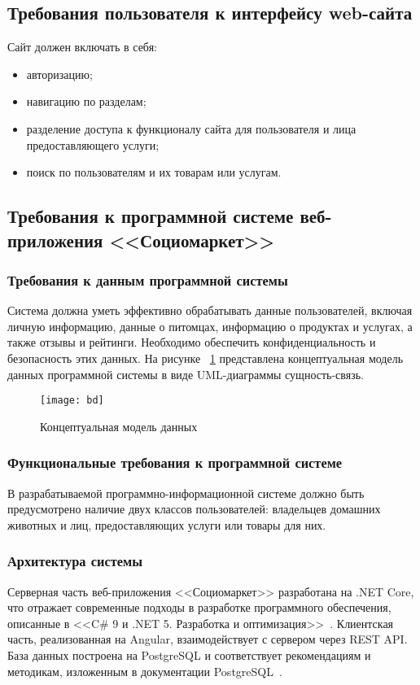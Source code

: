 \subsection{Требования пользователя к интерфейсу web-сайта}

Сайт должен включать в себя:
\begin{itemize}
    \item авторизацию;
    \item навигацию по разделам;
    \item разделение доступа к функционалу сайта для пользователя и лица предоставляющего услуги;
    \item поиск по пользователям и их товарам или услугам.
\end{itemize}


\subsection{Требования к программной системе веб-приложения <<Социомаркет>>}
\subsubsection{Требования к данным программной системы}
Система должна уметь эффективно обрабатывать данные пользователей, включая личную информацию, данные о питомцах, информацию о продуктах и услугах, а также отзывы и рейтинги. Необходимо обеспечить конфиденциальность и безопасность этих данных.
На рисунке ~\ref{bd:image} представлена концептуальная модель данных программной системы в виде UML-диаграммы сущность-связь.

\begin{figure}[ht]
\centering
\texttt{[image: bd]}
\caption{Концептуальная модель данных}
\label{bd:image}
\end{figure}

\subsubsection{Функциональные требования к программной системе}
В разрабатываемой программно-информационной системе должно быть предусмотрено наличие двух классов пользователей: владельцев домашних животных и лиц, предоставляющих услуги или товары для них.

\subsubsection{Архитектура системы} 
Серверная часть веб-приложения <<Социомаркет>> разработана на .NET Core, что отражает современные подходы в разработке программного обеспечения, описанные в <<C\# 9 и .NET 5. Разработка и оптимизация>>~\cite{mark_price}. Клиентская часть, реализованная на Angular, взаимодействует с сервером через REST API. База данных построена на PostgreSQL и соответствует рекомендациям и методикам, изложенным в документации PostgreSQL~\cite{postgresql}.

